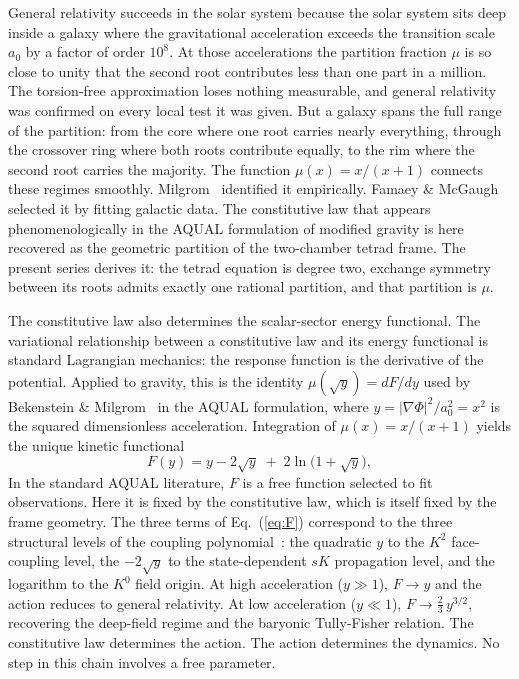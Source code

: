 \documentclass[twocolumn]{iopjournal}
\begin{document}
General relativity succeeds in the solar system because the
solar system sits deep inside a galaxy where the gravitational
acceleration exceeds the transition scale $a_0$ by a factor of
order $10^8$.  At those accelerations the partition fraction
$\mu$ is so close to unity that the second root contributes
less than one part in a million.  The torsion-free
approximation loses nothing measurable, and general relativity
was confirmed on every local test it was given.  But a galaxy
spans the full range of the partition: from the core where one
root carries nearly everything, through the crossover ring
where both roots contribute equally, to the rim where the
second root carries the majority.  The function
$\mu(x) = x/(x{+}1)$ connects these regimes smoothly.
Milgrom~\cite{Milgrom1983} identified it empirically.  Famaey
\& McGaugh~\cite{FamaeyMcGaugh2012} selected it by fitting
galactic data.  The constitutive law that appears
phenomenologically in the AQUAL formulation of modified
gravity is here recovered as the geometric partition of the
two-chamber tetrad frame.  The present series derives it: the
tetrad equation is degree two, exchange symmetry between its
roots admits exactly one rational partition, and that
partition is $\mu$.

The constitutive law also determines the scalar-sector
energy functional.  The variational relationship between a
constitutive law and its energy functional is standard
Lagrangian mechanics: the response function is the derivative
of the potential.  Applied to gravity, this is the identity
$\mu(\sqrt{y}) = dF/dy$ used by Bekenstein \&
Milgrom~\cite{BekensteinMilgrom1984} in the AQUAL
formulation, where
$y = |\nabla\Phi|^2/a_0^2 = x^2$ is the squared
dimensionless acceleration.  Integration of
$\mu(x) = x/(x{+}1)$ yields the unique kinetic functional
\begin{equation}
  F(y) = y - 2\sqrt{y} \;+\; 2\ln\!\bigl(1 + \sqrt{y}\bigr),
  \label{eq:F}
\end{equation}
In the standard AQUAL literature, $F$ is a free function
selected to fit observations.  Here it is fixed by the
constitutive law, which is itself fixed by the frame geometry.
The three terms of Eq.~(\ref{eq:F}) correspond to the three
structural levels of
the coupling polynomial~\cite{Nelson2026b}: the quadratic $y$
to the $K^2$ face-coupling level, the $-2\sqrt{y}$ to the
state-dependent $sK$ propagation level, and the logarithm to
the $K^0$ field origin.  At high acceleration ($y \gg 1$),
$F \to y$ and the action reduces to general relativity.  At
low acceleration ($y \ll 1$), $F \to \tfrac{2}{3}\,y^{3/2}$,
recovering the deep-field regime and the baryonic Tully-Fisher
relation.  The constitutive law determines the action.  The
action determines the dynamics.  No step in this chain
involves a free parameter.
\end{document}
